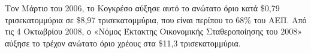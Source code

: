 \documentclass{article}
\newcommand{\gr}{\selectlanguage{greek}}
\begin{document}
\gr


Τον Μάρτιο του 2006, το Κογκρέσο αύξησε αυτό το ανώτατο όριο κατά  \$0,79 τρισεκατομμύρια  σε \$8,97 τρισεκατομμύρια, που είναι περίπου το 68\% του ΑΕΠ. Από τις 4 Οκτωβρίου 2008, ο «Νόμος Έκτακτης Οικονομικής Σταθεροποίησης του 2008» αύξησε το τρέχον ανώτατο όριο χρέους στα \$11,3 τρισεκατομμύρια.
\end{document}
